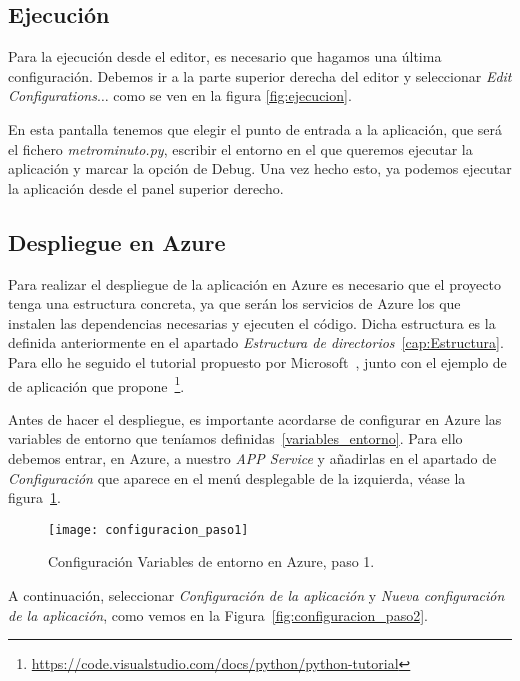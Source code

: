 \subsection{Ejecución}
Para la ejecución desde el editor, es necesario que hagamos una última configuración. Debemos ir a la parte superior derecha del editor y seleccionar \textit{Edit Configurations$\dots$} como se ven en la figura \ref{fig:ejecucion}.

En esta pantalla tenemos que elegir el punto de entrada a la aplicación, que será el fichero \textit{metrominuto.py}, escribir el entorno en el que queremos ejecutar la aplicación y marcar la opción de Debug. Una vez hecho esto, ya podemos ejecutar la aplicación desde el panel superior derecho.

\subsection{Despliegue en Azure}
Para realizar el despliegue de la aplicación en Azure es necesario que el proyecto tenga una estructura concreta, ya que serán los servicios de Azure los que instalen las dependencias necesarias y ejecuten el código. Dicha estructura es la definida anteriormente en el apartado \textit{Estructura de directorios}~\ref{cap:Estructura}. Para ello he seguido el tutorial propuesto por Microsoft~\cite{deploy-flask-azure}, junto con el ejemplo de de aplicación que propone~\footnote{\url{https://code.visualstudio.com/docs/python/python-tutorial}}.

Antes de hacer el despliegue, es importante acordarse de configurar en Azure las variables de entorno que teníamos definidas~\ref{variables_entorno}. Para ello debemos entrar, en Azure, a nuestro \textit{APP Service} y añadirlas en el apartado de \textit{Configuración} que aparece en el menú desplegable de la izquierda,  véase la figura~\ref{fig:configuracion_paso1}.

\begin{figure}[!h]
	\centering
	\texttt{[image: configuracion\_paso1]}
	\caption{Configuración Variables de entorno en Azure, paso 1.}\label{fig:configuracion_paso1}
\end{figure}
\FloatBarrier


A continuación, seleccionar \textit{Configuración de la aplicación} y \textit{Nueva configuración de la aplicación}, como vemos en la Figura~\ref{fig:configuracion_paso2}.

